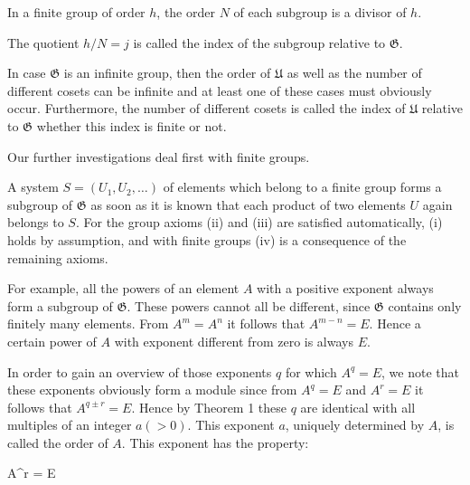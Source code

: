 In a finite group of order $h$, the order $N$ of each subgroup is a divisor of $h$.

The quotient $h/N = j$ is called the index of the subgroup relative to $\mathfrak{G}$.

In case $\mathfrak{G}$ is an infinite group, then the order of $\mathfrak{U}$ as well as the number of different cosets can be infinite and at least one of these cases must obviously occur. Furthermore, the number of different cosets is called the index of $\mathfrak{U}$ relative to $\mathfrak{G}$ whether this index is finite or not.

Our further investigations deal first with finite groups.

A system $S = (U_1, U_2, \ldots)$ of elements which belong to a finite group forms a subgroup of $\mathfrak{G}$ as soon as it is known that each product of two elements $U$ again belongs to $S$. For the group axioms (ii) and (iii) are satisfied automatically, (i) holds by assumption, and with finite groups (iv) is a consequence of the remaining axioms.

For example, all the powers of an element $A$ with a positive exponent always form a subgroup of $\mathfrak{G}$. These powers cannot all be different, since $\mathfrak{G}$ contains only finitely many elements. From $A^m = A^n$ it follows that $A^{m-n} = E$. Hence a certain power of $A$ with exponent different from zero is always $E$.

In order to gain an overview of those exponents $q$ for which $A^q = E$, we note that these exponents obviously form a module since from $A^q = E$ and $A^r = E$ it follows that $A^{q \pm r} = E$. Hence by Theorem 1 these $q$ are identical with all multiples of an integer $a (> 0)$. This exponent $a$, uniquely determined by $A$, is called the order of $A$. This exponent has the property:

$$A^r = E \quad {} \
